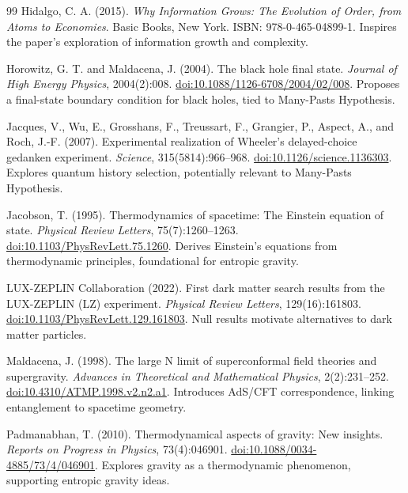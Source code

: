 \documentclass[11pt]{article}
\begin{document}
\begin{thebibliography}{99}
Hidalgo, C. A. (2015).
\newblock \emph{Why Information Grows: The Evolution of Order, from Atoms to Economies}.
\newblock Basic Books, New York.
\newblock ISBN: 978-0-465-04899-1.
\newblock Inspires the paper’s exploration of information growth and complexity.

Horowitz, G. T. and Maldacena, J. (2004).
\newblock The black hole final state.
\newblock \emph{Journal of High Energy Physics}, 2004(2):008.
\newblock \href{https://doi.org/10.1088/1126-6708/2004/02/008}{doi:10.1088/1126-6708/2004/02/008}.
\newblock Proposes a final-state boundary condition for black holes, tied to Many-Pasts Hypothesis.

Jacques, V., Wu, E., Grosshans, F., Treussart, F., Grangier, P., Aspect, A., and Roch, J.-F. (2007).
\newblock Experimental realization of Wheeler’s delayed-choice gedanken experiment.
\newblock \emph{Science}, 315(5814):966--968.
\newblock \href{https://doi.org/10.1126/science.1136303}{doi:10.1126/science.1136303}.
\newblock Explores quantum history selection, potentially relevant to Many-Pasts Hypothesis.

Jacobson, T. (1995).
\newblock Thermodynamics of spacetime: The Einstein equation of state.
\newblock \emph{Physical Review Letters}, 75(7):1260--1263.
\newblock \href{https://doi.org/10.1103/PhysRevLett.75.1260}{doi:10.1103/PhysRevLett.75.1260}.
\newblock Derives Einstein’s equations from thermodynamic principles, foundational for entropic gravity.

LUX-ZEPLIN Collaboration (2022).
\newblock First dark matter search results from the LUX-ZEPLIN (LZ) experiment.
\newblock \emph{Physical Review Letters}, 129(16):161803.
\newblock \href{https://doi.org/10.1103/PhysRevLett.129.161803}{doi:10.1103/PhysRevLett.129.161803}.
\newblock Null results motivate alternatives to dark matter particles.

Maldacena, J. (1998).
\newblock The large N limit of superconformal field theories and supergravity.
\newblock \emph{Advances in Theoretical and Mathematical Physics}, 2(2):231--252.
\newblock \href{https://doi.org/10.4310/ATMP.1998.v2.n2.a1}{doi:10.4310/ATMP.1998.v2.n2.a1}.
\newblock Introduces AdS/CFT correspondence, linking entanglement to spacetime geometry.

Padmanabhan, T. (2010).
\newblock Thermodynamical aspects of gravity: New insights.
\newblock \emph{Reports on Progress in Physics}, 73(4):046901.
\newblock \href{https://doi.org/10.1088/0034-4885/73/4/046901}{doi:10.1088/0034-4885/73/4/046901}.
\newblock Explores gravity as a thermodynamic phenomenon, supporting entropic gravity ideas.


\end{thebibliography}
\end{document}
